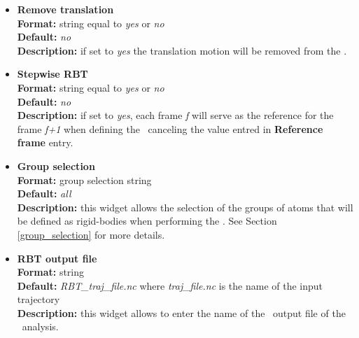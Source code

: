 \documentclass[a4paper,11pt]{report}
\begin{document}
\begin{itemize}
\hypertarget{rbt_remove_translation}{}
\item \textbf{Remove translation}\\
\textbf{Format:} string equal to \textit{yes} or \textit{no}\\
\textbf{Default:} \textit{no}\\
\textbf{Description:} if set to \textit{yes} the translation motion will be removed from the \RBT .

\hypertarget{rbt_stepwise_rbt}{}
\item \textbf{Stepwise RBT}\\
\textbf{Format:} string equal to \textit{yes} or \textit{no}\\
\textbf{Default:} \textit{no}\\
\textbf{Description:} if set to \textit{yes}, each frame \textit{f} will serve as the reference for the frame \textit{f+1} 
when defining the \RBT\ canceling the value entred in \textbf{Reference frame} entry.

\hypertarget{rbt_group_selection}{}
\item \textbf{Group selection}\\
\textbf{Format:} group selection string\\
\textbf{Default:} \textit{all}\\
\textbf{Description:} this widget allows the selection of the groups of atoms that will be defined as rigid-bodies when performing 
the \RBT . See Section \ref{group_selection} for more details.

\hypertarget{rbt_rbt_output_file}{}
\item \textbf{RBT output file}\\
\textbf{Format:} string\\
\textbf{Default:} \textit{RBT\_traj\_file.nc} where \textit{traj\_file.nc} is the name of the input trajectory\\
\textbf{Description:} this widget allows to enter the name of the \NetCDF\ output file of the \RBT\ analysis.
\end{itemize}
\end{document}
